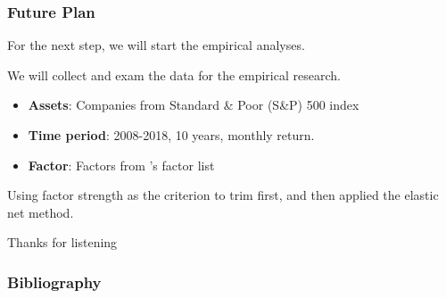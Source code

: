 \documentclass[12pt]{beamer}
\begin{document}
\begin{frame}
\frametitle{Future Plan}
For the next step, we will start the empirical analyses. 

We will collect and exam the data for the empirical research. 
\begin{itemize}
\item {\bf Assets}:  Companies from Standard \& Poor (S\&P) 500 index\\
\item {\bf Time period}: 2008-2018, 10 years, monthly return. \\
\item {\bf Factor}:  Factors from 's factor list\\
\end{itemize}
Using factor strength as the criterion to trim first, and then applied the elastic net method.
\end{frame}
\begin{frame}
	\centering	
\huge{ Thanks for listening\\}
\end{frame}


\begin{frame}[allowframebreaks]
	\frametitle{Bibliography}
	
{\footnotesize}
\end{frame}
\end{document}
